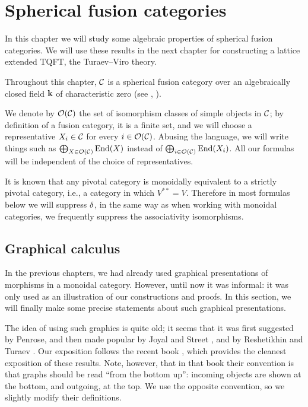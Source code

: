 \chapter{Spherical fusion categories}\label{c:spherical}

In this chapter we will study some algebraic properties of spherical fusion
categories. We will use these results in the next chapter for constructing
a lattice extended TQFT, the Turaev--Viro theory.

Throughout this chapter, $\mathcal{C}$ is a spherical fusion category over an
algebraically closed field $\mathbf{k}$ of characteristic zero (see ,
).

We denote by $\mathcal{O}(\mathcal{C})$ the set of isomorphism classes of simple objects in $\mathcal{C}$;
by definition of a fusion category, it is a finite set, and we will choose a
representative $X_i\in \mathcal{C}$ for every $i\in \mathcal{O}(\mathcal{C})$. Abusing the language, we
will write things such as $\bigoplus_{X\in \mathcal{O}(\mathcal{C})} \operatorname{End}(X)$ instead of
$\bigoplus_{i\in \mathcal{O}(\mathcal{C})}\operatorname{End}(X_i)$. All our formulas will be independent of the
choice of representatives.

It is known that any pivotal category is monoidally equivalent to a strictly
pivotal category, i.e., a category in which $V^{**}=V$. Therefore in most
formulas below we will suppress $\delta$, in the same way as when working with
monoidal categories, we frequently suppress the associativity isomorphisms.



\section{Graphical calculus}\label{s:graphical}
In the previous chapters, we had already used graphical presentations
of morphisms in a monoidal category. However, until now it was informal:
it was only used as an illustration of our constructions and proofs.
In this section, we will finally make some precise statements about such
graphical presentations.

The idea of using such graphics is quite old; it seems that it was first
suggested by Penrose, and then made popular by Joyal and Street
\cite{joyal-street}, \cite{joyal-street2} and by Reshetikhin and Turaev
\cite{reshetikhin-turaev}. Our exposition follows the recent book
\cite[Chapter 2]{turaev-virelizier}, which provides the cleanest exposition
of these results. Note, however, that in that book their convention is that
graphs should be read ``from the bottom up'': incoming objects are shown at the
bottom, and outgoing, at the top. We use the opposite convention, so we
slightly modify their definitions.

